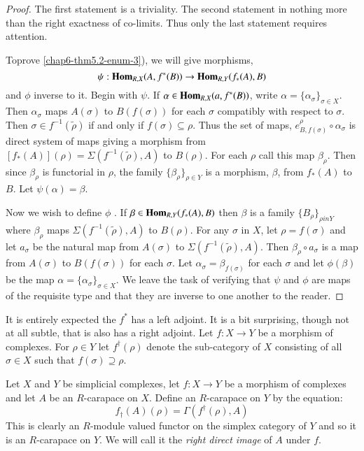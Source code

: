 \begin{proof}
The first statement is a triviality. The second statement in nothing more than the right exactness of co-limits. Thus only the last statement requires attention.

To\pageoriginale prove \ref{chap6-thm5.2-enum-3}), we will give morphisms,
$$
\psi : \operatorname{\mathbf{Hom}}_{R,X}(A, f^{*}(B))\rightarrow \operatorname{\mathbf{Hom}}_{R,Y}(f_{*}(A), B)
$$
and $\phi$ inverse to it. Begin with $\psi$. If $\alpha \in  \operatorname{\mathbf{Hom}}_{R,X}(a, f^{*}(B))$, write $\alpha =\{\alpha_{\sigma}\}_{\sigma \in X}$. Then $\alpha_{\sigma}$ maps $A(\sigma)$ to $B(f(\sigma))$ for each $\sigma$ compatibly with respect to $\sigma$. Then  $\sigma \in f^{-1}(\tilde{\rho})$ if and only if $f(\sigma)\subseteq \rho$. Thus the set of maps, $e_{B, f(\sigma)}^{\rho} \circ \alpha_{\sigma}$ is direct system of maps giving a morphism from $[f_{*}(A)](\rho)= \Sigma(f^{-1}(\tilde{\rho}), A)$ to $B(\rho)$. For each $\rho$ call this map $\beta_{\rho}$. Then since $\beta_{\rho}$ is functorial in $\rho$, the family $\{\beta_{\rho}\}_{\rho \in Y}$ is a morphism, $\beta$, from $f_{*}(A)$ to $B$. Let $\psi (\alpha) = \beta$.

Now we wish to define $\phi$ . If $\beta \in \operatorname{\mathbf{Hom}}_{R,Y}(f_{*}(A), B)$ then $\beta$ is a family $\{B_{\rho}\}_{\rho in Y}$ where $\beta_{\rho}$ maps $\Sigma(f^{-1}(\tilde{\rho}), A)$ to $B(\rho)$. For any $\sigma$ in $X$, let $\rho = f(\sigma)$ and let $a_{\sigma}$ be the natural map from $A(\sigma)$ to $\Sigma(f^{-1}(\tilde{\rho}), A)$. Then $\beta_{\rho} \circ a_{\sigma}$ is a map from $A(\sigma)$ to $B(f(\sigma))$ for each $\sigma$. Let $\alpha_{\sigma} = \beta_{f(\sigma)}$ for each $\sigma$ and let $\phi(\beta)$ be the map $\alpha = \{\alpha_{\sigma}\}_{\sigma \in X}$. We leave the task of verifying that $\psi$ and $\phi$ are maps of the requisite type and that they are inverse to one another to the reader.
\end{proof}

It is entirely expected the $f^{*}$ has a left adjoint. It is a bit surprising, though not at all subtle, that is also has a right adjoint. Let $f : X \rightarrow Y$ be a morphism of complexes. For $\rho \in Y$ let $f^\dagger(\rho)$ denote the sub-category of $X$ consisting of all $\sigma \in X$ such that $f(\sigma) \supseteq \rho$.

\begin{definition}\label{chap6-definition-5.6}
Let $X$ and $Y$ be simplicial complexes, let $f : X\rightarrow Y$ be a morphism of complexes and let $A$ be an $R$-carapace on $X$. Define an $R$-carapace on $Y$ by the equation:
$$
f_{\dagger}(A)(\rho) = \Gamma(f^{\dagger}(\rho), A)
$$
This is clearly an $R$-module valued functor on the simplex category of $Y$ and so it is an $R$-carapace on $Y$. We will call it the \textit{right direct image} of $A$ under $f$.
\end{definition} 


